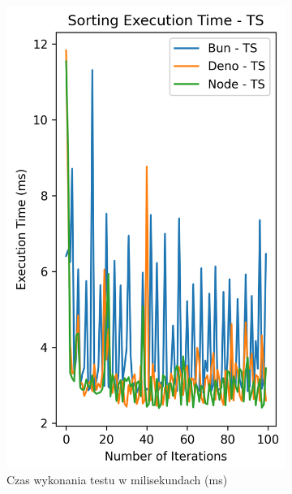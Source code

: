 \begin{figure}[H]
  \centering
  \begin{subfigure}[b]{0.4\textwidth}
    \centering
    \includegraphics[width=\textwidth]{Figures/sorting/sorting_quick_100_10000_ts_time.png}
    \caption{Czas wykonania testu w milisekundach (ms)}
    \label{fig:quick_sorting_e3_ts_time}
  \end{subfigure}
  \begin{subfigure}[b]{0.4\textwidth}
    \centering

\end{subfigure}
\end{figure}
